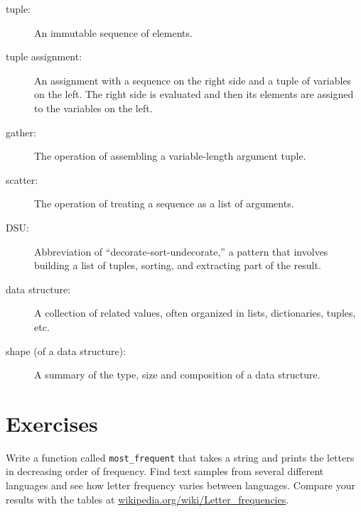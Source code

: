 \documentclass[10pt]{book}
\begin{document}
\begin{description}

\item[tuple:] An immutable sequence of elements.

\item[tuple assignment:] An assignment with a sequence on the
right side and a tuple of variables on the left.  The right
side is evaluated and then its elements are assigned to the
variables on the left.

\item[gather:] The operation of assembling a variable-length
argument tuple.

\item[scatter:] The operation of treating a sequence as a list of
arguments.

\item[DSU:] Abbreviation of ``decorate-sort-undecorate,'' a
pattern that involves building a list of tuples, sorting, and
extracting part of the result.

\item[data structure:] A collection of related values, often
organized in lists, dictionaries, tuples, etc.

\item[shape (of a data structure):] A summary of the type,
size and composition of a data structure.

\end{description}


\section{Exercises}

\begin{ex}
Write a function called \verb"most_frequent" that takes a string and
prints the letters in decreasing order of frequency.  Find text
samples from several different languages and see how letter frequency
varies between languages.  Compare your results with the tables at
\url{wikipedia.org/wiki/Letter_frequencies}.


\end{ex}
\end{document}
